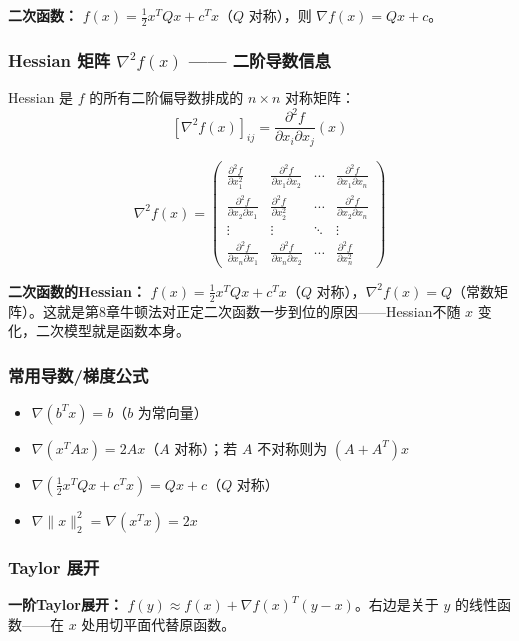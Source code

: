 \textbf{二次函数：} $f(x)=\frac12 x^T Q x + c^T x$（$Q$ 对称），则 $\nabla f(x)=Qx+c$。

\subsubsection{Hessian 矩阵 $\nabla^2 f(x)$ —— 二阶导数信息}

Hessian 是 $f$ 的所有二阶偏导数排成的 $n\times n$ 对称矩阵：
\[
[\nabla^2 f(x)]_{ij} = \frac{\partial^2 f}{\partial x_i \partial x_j}(x)
\]

\[
\nabla^2 f(x) = \begin{pmatrix}
\frac{\partial^2 f}{\partial x_1^2} & \frac{\partial^2 f}{\partial x_1\partial x_2} & \cdots & \frac{\partial^2 f}{\partial x_1\partial x_n} \\[4pt]
\frac{\partial^2 f}{\partial x_2\partial x_1} & \frac{\partial^2 f}{\partial x_2^2} & \cdots & \frac{\partial^2 f}{\partial x_2\partial x_n} \\
\vdots & \vdots & \ddots & \vdots \\
\frac{\partial^2 f}{\partial x_n\partial x_1} & \frac{\partial^2 f}{\partial x_n\partial x_2} & \cdots & \frac{\partial^2 f}{\partial x_n^2}
\end{pmatrix}
\]

\textbf{二次函数的Hessian：} $f(x)=\frac12 x^T Q x + c^T x$（$Q$ 对称），$\nabla^2 f(x)=Q$（常数矩阵）。这就是第8章牛顿法对正定二次函数一步到位的原因——Hessian不随 $x$ 变化，二次模型就是函数本身。

\subsubsection{常用导数/梯度公式}

\begin{itemize}
  \item $\nabla(b^T x) = b$（$b$ 为常向量）
  \item $\nabla(x^T A x) = 2Ax$（$A$ 对称）；若 $A$ 不对称则为 $(A+A^T)x$
  \item $\nabla(\frac12 x^T Q x + c^T x) = Qx + c$（$Q$ 对称）
  \item $\nabla\|x\|_2^2 = \nabla(x^T x) = 2x$
\end{itemize}

\subsubsection{Taylor 展开}

\textbf{一阶Taylor展开：} $f(y) \approx f(x) + \nabla f(x)^T(y-x)$。右边是关于 $y$ 的线性函数——在 $x$ 处用切平面代替原函数。

